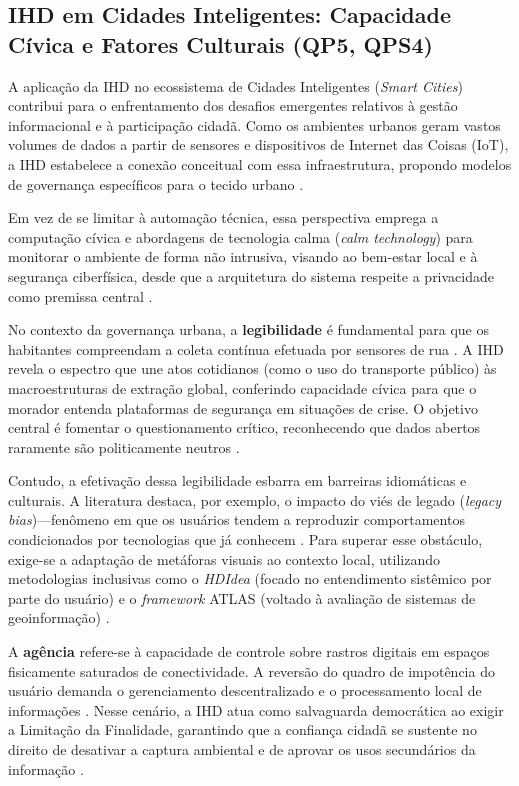 \documentclass[12pt]{article}
\begin{document}
    \subsection{IHD em Cidades Inteligentes: Capacidade Cívica e Fatores Culturais (QP5, QPS4)}

    A aplicação da IHD no ecossistema de Cidades Inteligentes (\textit{Smart Cities}) contribui para o enfrentamento dos desafios emergentes relativos à gestão informacional e à participação cidadã. Como os ambientes urbanos geram vastos volumes de dados a partir de sensores e dispositivos de Internet das Coisas (IoT), a IHD estabelece a conexão conceitual com essa infraestrutura, propondo modelos de governança específicos para o tecido urbano \cite{Mashhadi2014, Chowdhury2016, barcellos2022towards}.

    Em vez de se limitar à automação técnica, essa perspectiva emprega a computação cívica e abordagens de tecnologia calma (\textit{calm technology}) para monitorar o ambiente de forma não intrusiva, visando ao bem-estar local e à segurança ciberfísica, desde que a arquitetura do sistema respeite a privacidade como premissa central \cite{Konomi2022, Chowdhury2016}.

    No contexto da governança urbana, a \textbf{legibilidade} é fundamental para que os habitantes compreendam a coleta contínua efetuada por sensores de rua \cite{Coleti2019DesigPatterns, Hutton2017}. A IHD revela o espectro que une atos cotidianos (como o uso do transporte público) às macroestruturas de extração global, conferindo capacidade cívica para que o morador entenda plataformas de segurança em situações de crise. O objetivo central é fomentar o questionamento crítico, reconhecendo que dados abertos raramente são politicamente neutros \cite{Parviainen2016, barcellos2022towards}.

    Contudo, a efetivação dessa legibilidade esbarra em barreiras idiomáticas e culturais. A literatura destaca, por exemplo, o impacto do viés de legado (\textit{legacy bias})---fenômeno em que os usuários tendem a reproduzir comportamentos condicionados por tecnologias que já conhecem \cite{Friedman2024}. Para superar esse obstáculo, exige-se a adaptação de metáforas visuais ao contexto local, utilizando metodologias inclusivas como o \textit{HDIdea} (focado no entendimento sistêmico por parte do usuário) \cite{Strey2019Human} e o \textit{framework} ATLAS (voltado à avaliação de sistemas de geoinformação) \cite{Capeleti2024Human}.

    A \textbf{agência} refere-se à capacidade de controle sobre rastros digitais em espaços fisicamente saturados de conectividade. A reversão do quadro de impotência do usuário demanda o gerenciamento descentralizado e o processamento local de informações \cite{Sailaja2021, Crabtree2016}. Nesse cenário, a IHD atua como salvaguarda democrática ao exigir a Limitação da Finalidade, garantindo que a confiança cidadã se sustente no direito de desativar a captura ambiental e de aprovar os usos secundários da informação \cite{Mashhadi2014}.
\end{document}
